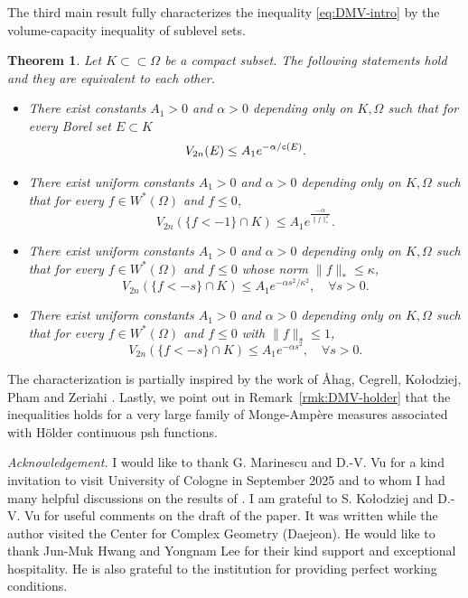 \documentclass{amsart}
\newcommand{\al}{\alpha}
\newcommand{\ka}{\kappa}
\newcommand{\tc}{{\tt c}}
\newcommand{\Om}{\Omega}
\newtheorem{thm}{Theorem}
\theoremstyle{definition}
\numberwithin{thm}{section}
\numberwithin{equation}{section}
\renewcommand{\[}{\begin{equation}}
\renewcommand{\]}{\end{equation}}
\begin{document}
The third main result fully characterizes the inequality \eqref{eq:DMV-intro} by the volume-capacity inequality of sublevel sets.
 
\begin{thm} \label{prop:equiv-est-intro} Let $K\subset\subset \Om$ be a compact subset.  The following statements hold and they are equivalent to each other.
\begin{itemize}
\item[(a)] 
There exist constants $A_1>0$ and $\al>0$ depending only on $K, \Om$ such that for every  Borel  set $E\subset K$ $$V_{2n}(E) \leq A_1 e^{-\al/\tc (E)}.$$

\item[(b)] There exist uniform constants $A_1>0$ and $\al>0$ depending only on $K, \Om$ such that for every  $f\in W^*(\Om)$ and $f\leq 0$,
 $$V_{2n}(\{f< -1\} \cap K) \leq A_1 e^{\frac{-\al}{\|f\|_*^{2}}}.$$
\item
[(c)]   There exist uniform constants $A_1>0$ and $\al>0$ depending only on $K, \Om$ such that for every $f\in W^*(\Om)$ and $f\leq 0$ whose norm $\|f\|_* \leq 
\ka$,
$$V_{2n} (\{f < -s\} \cap K) \leq A_1 e^{-\al s^2/\ka^2}, \quad \forall s>0.$$

\item 
[(d)]  There exist uniform constants $A_1>0$ and $\al>0$ depending only on $K, \Om$ such that for every $f\in W^*(\Om)$ and $f\leq 0$ with $\|f\|_* \leq 1$,
$$V_{2n} (\{f < -s\} \cap K) \leq A_1 e^{-\al s^2}, \quad \forall s>0.$$
\end{itemize}
\end{thm}

 
The characterization is partially inspired by the work of \AA hag, Cegrell, Ko\l odziej, Pham and Zeriahi \cite{ACKPZ09}. Lastly, we point out in Remark~\ref{rmk:DMV-holder} that the inequalities holds for a very large family  of Monge-Amp\`ere measures associated with  H\"older continuous psh functions.

\bigskip

{\em Acknowledgement.} I would like to thank G. Marinescu and D.-V. Vu for a kind invitation to visit University of Cologne in September 2025 and to whom I had many helpful discussions on the results of \cite{DMV}.  I am grateful to S. Ko\l odziej and D.-V. Vu for useful comments on the draft of the paper. It was written while the author  visited the Center for Complex Geometry (Daejeon). He would like to thank Jun-Muk Hwang and Yongnam Lee for their kind support and exceptional hospitality. He is also grateful to the institution for providing perfect working conditions.  
\end{document}
